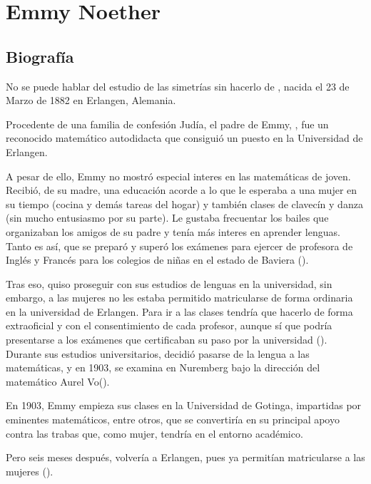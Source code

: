 \chapter{Emmy Noether}\label{ch:emmy-noether}

\section{Biografía}\label{sec:biografia}

No se puede hablar del estudio de las simetrías sin hacerlo de , nacida el 23 de Marzo de 1882 en Erlangen, Alemania.

Procedente de una familia de confesión Judía, el padre de Emmy, , fue un reconocido matemático autodidacta que consiguió un puesto en la Universidad de Erlangen.

A pesar de ello, Emmy no mostró especial interes en las matemáticas de joven.
Recibió, de su madre, una educación acorde a lo que le esperaba a una mujer en su tiempo (cocina y demás tareas del hogar) y también clases de clavecín y danza (sin mucho entusiasmo por su parte).
Le gustaba frecuentar los bailes que organizaban los amigos de su padre y tenía más interes en aprender lenguas.
Tanto es así, que se preparó y superó los exámenes para ejercer de profesora de Inglés y Francés para los colegios de niñas en el estado de Baviera (\cite{Carrasco}).

Tras eso, quiso proseguir con sus estudios de lenguas en la universidad, sin embargo, a las mujeres no les estaba permitido matricularse de forma ordinaria en la universidad de Erlangen.
Para ir a las clases tendría que hacerlo de forma extraoficial y con el consentimiento de cada profesor, aunque sí que podría presentarse a los exámenes que certificaban su paso por la universidad (\cite{Kimberling}).
Durante sus estudios universitarios, decidió pasarse de la lengua a las matemáticas, y en 1903, se examina en Nuremberg bajo la dirección del matemático Aurel Vo\beta (\cite{Kimberling}).

En 1903, Emmy empieza sus clases en la Universidad de Gotinga, impartidas por eminentes matemáticos, entre otros,  que se convertiría en su principal apoyo contra las trabas que, como mujer, tendría en el entorno académico.

Pero seis meses después, volvería a Erlangen, pues ya permitían matricularse a las mujeres (\cite{Kimberling}).

